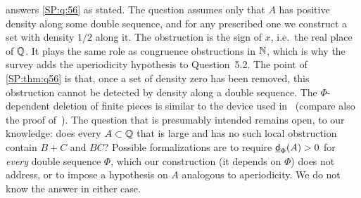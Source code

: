 \begin{remark}\label{SP:rem:q56literal}
 answers \cref{SP:q:56} as stated. The question assumes only that $A$ has positive
density along some double \Fol{} sequence, and for any prescribed one we construct a set with
density $1/2$ along it. The obstruction is the sign of $x$, i.e.\ the real place of $\mathbb{Q}$. It plays the same role as
congruence obstructions in $\mathbb{N}$, which is why the survey adds the aperiodicity hypothesis to
Question~5.2. The point of \cref{SP:thm:q56} is that, once a set of density zero has been removed,
this obstruction cannot be detected by density along a double \Fol{} sequence. The $\Phi$-dependent deletion of finite pieces is similar to the device used
in~\cite[Example~5.9]{kra2023problems} (compare also the proof
of~\cite[Proposition~3.2]{kra2023problems}). The question that is
presumably intended remains open, to our knowledge: does every $A\subset\mathbb{Q}$ that is large and has no such local
obstruction contain $B+C$ and $BC$? Possible formalizations are to require $\underline{\mathsf{d}}_\Phi(A)>0$
for \emph{every} double \Fol{} sequence $\Phi$, which our construction (it depends on $\Phi$) does
not address, or to impose a hypothesis on $A$ analogous to aperiodicity. We do not know the answer
in either case.
\end{remark}
